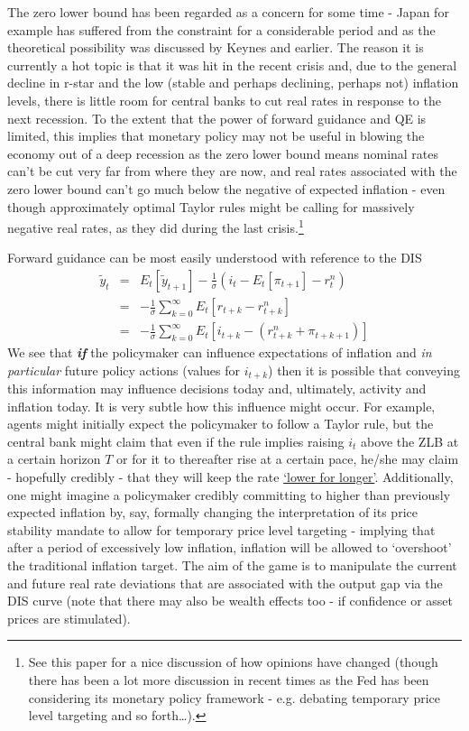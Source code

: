 \documentclass[authoryear,11pt]{elsarticle}
\begin{document}
The zero lower bound has been regarded as a concern for some time - Japan for example has suffered from the constraint for a considerable period and as the theoretical possibility was discussed by Keynes and earlier. The reason it is currently a hot topic is that it was hit in the recent crisis and, due to the general decline in r-star and the low (stable and perhaps declining, perhaps not) inflation levels, there is little room for central banks to cut real rates in response to the next recession. To the extent that the power of forward guidance and QE is limited, this implies that monetary policy may not be useful in blowing the economy out of a deep recession as the zero lower bound means nominal rates can't be cut very far from where they are now, and real rates associated with the zero lower bound can't go much below the negative of expected inflation - even though approximately optimal Taylor rules might be calling for massively negative real rates, as they did during the last crisis.\footnote{See this paper for a nice discussion of how opinions have changed (though there has been a lot more discussion in recent times as the Fed has been considering its monetary policy framework - e.g. debating temporary price level targeting and so forth\ldots).}

Forward guidance can be most easily understood with reference to the DIS
\begin{eqnarray*}
\tilde{y}_{t} &=& E_{t} \left[ \tilde{y}_{t+1} \right] - \frac{1}{\sigma} \left(i_{t} - E_{t}\left[ \pi_{t+1} \right]  - r^{n}_{t} \right) \label{eqn:dyn_IS} \\
&=& -\frac{1}{\sigma} \sum\limits_{k=0}^{\infty} E_{t}[ r_{t+k}  - r^{n}_{t+k} ] \nonumber \\
&=& -\frac{1}{\sigma} \sum\limits_{k=0}^{\infty} E_{t}[ i_{t+k} -  (r^{n}_{t+k} + \pi_{t+k+1}) ] \nonumber
\end{eqnarray*}
We see that \textit{\textbf{if}} the policymaker can influence expectations of inflation and \textit{in particular} future policy actions (values for $i_{t+k}$) then it is possible that conveying this information may influence decisions today and, ultimately, activity and inflation today. It is very subtle how this influence might occur. For example, agents might initially expect the policymaker to follow a Taylor rule, but the central bank might claim that even if the rule implies raising $i_{t}$ above the ZLB at a certain horizon $T$ or for it to thereafter rise at a certain pace, he/she may claim - hopefully credibly - that they will keep the rate \href{https://www.reuters.com/article/us-usa-fed-williams/feds-williams-makes-case-for-lower-for-longer-rates-idUSKCN1S91OE}{`lower for longer'}. Additionally, one might imagine a policymaker credibly committing to higher than previously expected inflation by, say, formally changing the interpretation of its price stability mandate to allow for temporary price level targeting - implying that after a period of excessively low inflation, inflation will be allowed to `overshoot' the traditional inflation target. The aim of the game is to manipulate the current and future real rate deviations that are associated with the output gap via the DIS curve (note that there may also be wealth effects too - if confidence or asset prices are stimulated).
\end{document}
